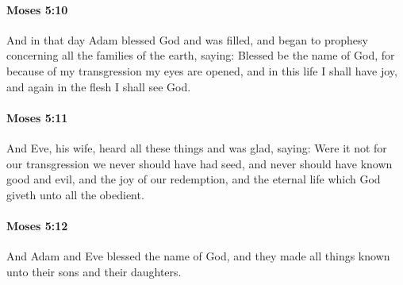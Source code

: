 		\paragraph{Moses 5:10} %
			\label{MOSES-5-10}

			And in that day Adam blessed God and was filled, and began to prophesy concerning all the families of the earth, saying: Blessed be the name of God, for because of my transgression my eyes are opened, and in this life I shall have joy, and again in the flesh I shall see God.


		\paragraph{Moses 5:11} %
			\label{MOSES-5-11}

			And Eve, his wife, heard all these things and was glad, saying: Were it not for our transgression we never should have had seed, and never should have known good and evil, and the joy of our redemption, and the eternal life which God giveth unto all the obedient.


		\paragraph{Moses 5:12} %
			\label{MOSES-5-12}

			And Adam and Eve blessed the name of God, and they made all things known unto their sons and their daughters.


